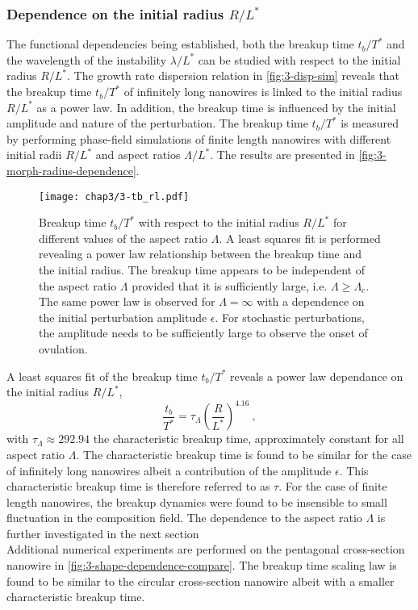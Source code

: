 \subsubsection{Dependence on the initial radius $R/L^*$}
The functional dependencies being established, both the breakup time $t_b/T^*$ and the wavelength of the instability $\lambda/L^*$ can be studied with respect to the initial radius $R/L^*$. The growth rate dispersion relation in \autoref{fig:3-disp-sim} reveals that the breakup time $t_b/T^*$ of infinitely long nanowires is linked to the initial radius $R/L^*$ as a power law. In addition, the breakup time is influenced by the initial amplitude and nature of the perturbation.
The breakup time $t_b/T^*$ is measured by performing phase-field simulations of finite length nanowires with different initial radii $R/L^*$ and aspect ratios $\Lambda/L^*$. The results are presented in \autoref{fig:3-morph-radius-dependence}.
\begin{figure}[H]
    \centering
    \texttt{[image: chap3/3-tb\_rl.pdf]}
    \caption{Breakup time $t_b/T^*$ with respect to the initial radius $R/L^*$ for different values of the aspect ratio $\Lambda$. A least squares fit is performed revealing a power law relationship between the breakup time and the initial radius. The breakup time appears to be independent of the aspect ratio $\Lambda$ provided that it is sufficiently large, i.e. $\Lambda \geq \Lambda_c$. The same power law is observed for $\Lambda=\infty$ with a dependence on the initial perturbation amplitude $\epsilon$. For stochastic perturbations, the amplitude needs to be sufficiently large to observe the onset of ovulation.}
    \label{fig:3-morph-radius-dependence}
\end{figure}
A least squares fit of the breakup time $t_b/T^*$ reveals a power law dependance on the initial radius $R/L^*$,
\begin{equation} 
    \frac{t_b}{T^*} = \tau_\Lambda \left(\frac{R}{L^*}\right)^{4.16}\ ,
\end{equation}
with $\tau_\Lambda \approx 292.94$ the characteristic breakup time, approximately constant for all aspect ratio $\Lambda$. The characteristic breakup time is found to be similar for the case of infinitely long nanowires albeit a contribution of the amplitude $\epsilon$. This characteristic breakup time is therefore referred to as $\tau$. For the case of finite length nanowires, the breakup dynamics were found to be insensible to small fluctuation in the composition field.
The dependence to the aspect ratio $\Lambda$ is further investigated in the next section\\
Additional numerical experiments are performed on the pentagonal cross-section nanowire in \autoref{fig:3-shape-dependence-compare}. The breakup time scaling law is found to be similar to the circular cross-section nanowire albeit with a smaller characteristic breakup time. 

